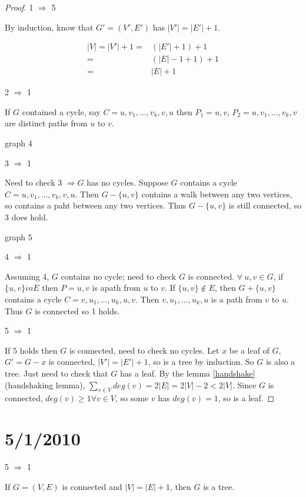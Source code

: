 \documentclass{article}
\begin{document}
\begin{proof}
1 $\Rightarrow$ 5

By induction, know that $G' = (V', E')$ has $|V'| = |E'| +1$.

\begin{align*}
|V| = |V'| +1 =& (|E'| +1) +1 \\
 =& (|E|-1 +1) +1  \\
=&  |E| +1 
\end{align*}

2 $\Rightarrow$ 1

If $G$ contained a cycle, say $C=u,v_1, \ldots, v_k, v, u$ then $P_1 = u,v$, $P_2= u, v_1, \ldots, v_k,v$ are distinct paths from $u$ to $v$.

graph 4

3 $\Rightarrow$ 1

Need to check 3 $\Rightarrow G$ has no cycles.  Suppose $G$ contains a cycle $C= u, v_1, \ldots, v_k, v, u$.  Then $G-\{u,v\}$ contains a walk between any two vertices, so contains a paht between any two vertices. Thus $G-\{u,v\}$ is still connected, so 3 does hold.

graph 5

4 $\Rightarrow$ 1

Assuming 4, $G$ contains no cycle; need to check $G$ is connected.  $\forall ~ u,v \in G$, if $\{u,v\} in E$ then $P=u,v$ is  apath from $u$ to $v$.  If $\{u,v \} \notin E$, then $G + \{u,v\}$ contains a cycle $C = v, u_1, \ldots, u_k, u, v$.  Then $v, u_1, \ldots, u_k, u$ is a path from $v$ to $u$.  Thus $G$ is connected so 1 holds.

5 $\Rightarrow$ 1

If 5 holds then $G$ is connected, need to check no cycles.  Let $x$ be a leaf of $G$, $G' = G-x$ is connected, $|V'| = |E'| +1$, so is a tree by induction.  So $G$ is also a tree.  Just need to check that $G$ has a leaf.  By the lemma \ref{handshake}(handshaking lemma), $\displaystyle \sum_{v \in V} deg(v) = 2 |E| = 2|V| -2 < 2|V|$.  Since $G$ is connected, $deg(v) \geq 1 \forall v \in V$, so some $v$ has $deg(v)=1$, so is a leaf.
\end{proof}

\section*{5/1/2010}

5 $\Rightarrow$ 1

\begin{clm}
If $G=(V,E)$ is connected and $|V| = |E|+1$, then $G$ is a tree.
\end{clm}
\end{document}
